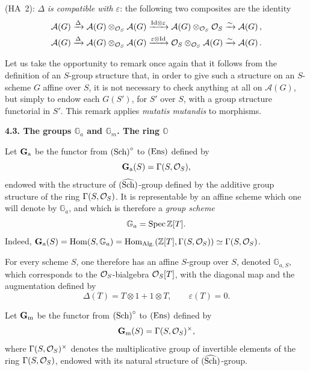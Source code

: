 (HA~2): \(\Delta\) \emph{is compatible with \(\varepsilon\)}: the following
two composites are the identity
\begin{gather*}
\mathcal{A}(G)\xrightarrow{\Delta}
  \mathcal{A}(G)\otimes_{\mathcal{O}_S}\mathcal{A}(G)
  \xrightarrow{\mathrm{Id}\otimes\varepsilon}
  \mathcal{A}(G)\otimes_{\mathcal{O}_S}\mathcal{O}_S
  \xrightarrow{\sim}\mathcal{A}(G)\,,\\
\mathcal{A}(G)\xrightarrow{\Delta}
  \mathcal{A}(G)\otimes_{\mathcal{O}_S}\mathcal{A}(G)
  \xrightarrow{\varepsilon\otimes\mathrm{Id}}
  \mathcal{O}_S\otimes_{\mathcal{O}_S}\mathcal{A}(G)
  \xrightarrow{\sim}\mathcal{A}(G)\,.
\end{gather*}

Let us take the opportunity to remark once again that it follows from the
definition of an \(S\)-group structure that, in order to give such a
structure on an \(S\)-scheme \(G\) affine over \(S\), it is not necessary to
check anything at all on \(\mathcal{A}(G)\), but simply to endow each
\(G(S')\), for \(S'\) over \(S\), with a group structure functorial in
\(S'\).
This remark applies \emph{mutatis mutandis} to morphisms.

\par{}
\noindent\textbf{4.3. The groups \(\mathbb{G}_a\) and \(\mathbb{G}_m\). The ring \(\mathbb{O}\)}\label{I.4.3}

\label{I.4.3.1}
Let \(\mathbf{G}_{\mathrm{a}}\) be the functor from \(\textup{(Sch)}^{\circ}\) to \(\textup{(Ens)}\) defined by
\[
\mathbf{G}_{\mathrm{a}}(S)=\Gamma(S,\mathcal{O}_S),
\]
endowed with the structure of \((\widehat{\textup{Sch}})\)-group defined by
the additive group structure of the ring \(\Gamma(S,\mathcal{O}_S)\). It is
representable by an affine scheme which one will denote by \(\mathbb{G}_a\),
and which is therefore a \emph{group scheme}
\[
\mathbb{G}_a=\operatorname{Spec}\mathbb{Z}[T].
\]
Indeed,
\(\mathbf{G}_{\mathrm{a}}(S)=\operatorname{Hom}(S,\mathbb{G}_a)
=\operatorname{Hom}_{\mathrm{Alg.}}(\mathbb{Z}[T],\Gamma(S,\mathcal{O}_S))
\simeq\Gamma(S,\mathcal{O}_S)\).

For every scheme \(S\), one therefore has an affine \(S\)-group over \(S\),
denoted \(\mathbb{G}_{a,S}\), which corresponds to the \(\mathcal{O}_S\)-bialgebra
\(\mathcal{O}_S[T]\), with the diagonal map and the augmentation defined by
\[
\Delta(T)=T\otimes 1+1\otimes T,
\qquad
\varepsilon(T)=0.
\]

\label{I.4.3.2}
Let \(\mathbf{G}_{\mathrm{m}}\) be the functor from \(\textup{(Sch)}^{\circ}\) to \(\textup{(Ens)}\) defined by
\[
\mathbf{G}_{\mathrm{m}}(S)=\Gamma(S,\mathcal{O}_S)^{\times},
\]
where \(\Gamma(S,\mathcal{O}_S)^{\times}\) denotes the multiplicative group of
invertible elements of the ring \(\Gamma(S,\mathcal{O}_S)\), endowed with its natural
structure of \((\widehat{\textup{Sch}})\)-group.
